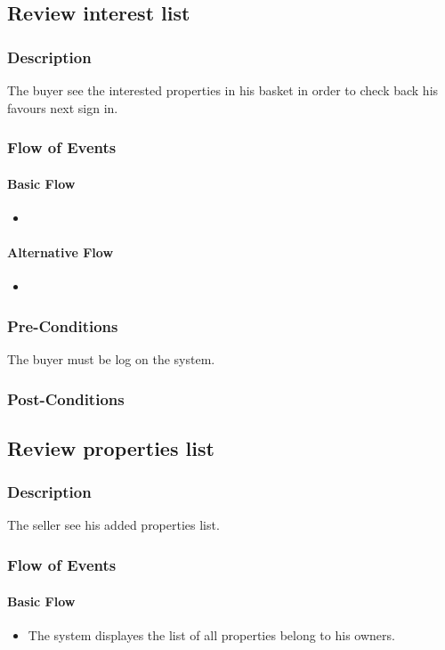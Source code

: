 \documentclass[a4paper,12pt]{article}
\begin{document}
\subsection{Review interest list}
\subsubsection{Description}
The buyer see the interested properties in his basket in order to check back his favours next sign in.
\subsubsection{Flow of Events}
\paragraph{Basic Flow}
\begin{itemize}
\item
\end{itemize}
\paragraph{Alternative Flow}
\begin{itemize}
\item
\end{itemize}
\subsubsection{Pre-Conditions}
The buyer must be log on the system.
\subsubsection{Post-Conditions}

\subsection{Review properties list}
\subsubsection{Description}
The seller see his added properties list.
\subsubsection{Flow of Events}
\paragraph{Basic Flow}
\begin{itemize}
\item The system displayes the list of all properties belong to his owners.
\end{itemize}
\end{document}
